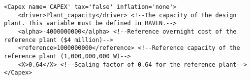 \begin{lstlisting}[style=XML,morekeywords={anAttribute},caption=CashFlow input example., label=lst:CashFlowExample]
<Capex name='CAPEX' tax='false' inflation='none'>
    <driver>Plant_capacity</driver> <!--The capacity of the design plant. This variable must be defined in RAVEN.-->
    <alpha>-4000000000</alpha> <!--Reference overnight cost of the reference plant ($4 million)-->
    <reference>1000000000</reference> <!--Reference capacity of the reference plant (1,000,000,000 W)-->
    <X>0.64</X> <!--Scaling factor of 0.64 for the reference plant-->
</Capex>
\end{lstlisting}